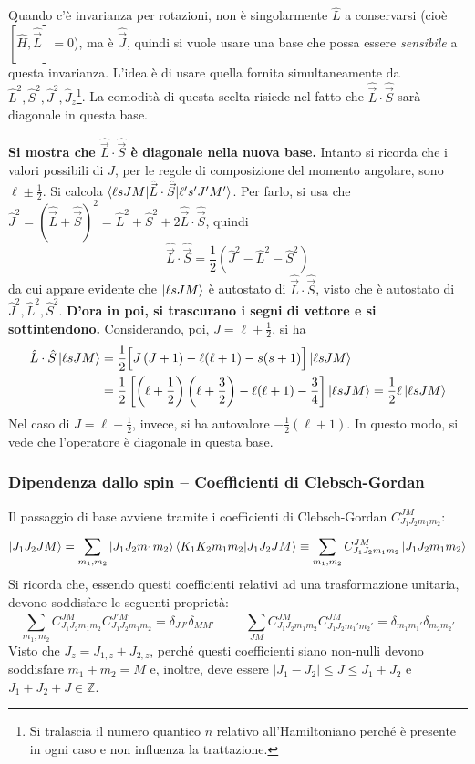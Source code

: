 \documentclass[11pt, a4paper]{scrartcl} %
\numberwithin{equation}{subsection}
\theoremstyle{style2}
\theoremstyle{style1}
\begin{document}
Quando c'\`e invarianza per rotazioni, non \`e singolarmente $\hat{L}$ a conservarsi (cio\`e $[\hat{H}, \hat{\vec{L}}] = 0$), ma \`e $\hat{\vec{J}}$, quindi si vuole usare una base che possa essere \textit{sensibile} a questa invarianza.
L'idea \`e di usare  quella fornita simultaneamente da $\hat{L}^2, \hat{S}^2, \hat{J}^2 , \hat{J}_z$\footnote{Si tralascia il numero quantico $n$ relativo all'Hamiltoniano perch\'e \`e presente in ogni caso e non influenza la trattazione.}.
La comodit\`a di questa scelta risiede nel fatto che $\hat{\vec{L}}\cdot \hat{\vec{S}}$ sar\`a diagonale in questa base.

\vspace{.5cm}	
{\bfseries\sffamily Si mostra che $\hat{\vec{L}}\cdot \hat{\vec{S}}$ \`e diagonale nella nuova base.} Intanto si ricorda che i valori possibili di $J$, per le regole di composizione del momento angolare, sono $\ell  \pm \frac{1}{2}$.
Si calcola $\braket{\ell sJM|\hat{\vec{L}}\cdot \hat{\vec{S}}|\ell 's' J'M'} $.
Per farlo, si usa che $\hat{J}^2 = (\hat{\vec{L}}+ \hat{\vec{S}})^2 = \hat{L}^2 + \hat{S}^2 + 2 \hat{\vec{L}}\cdot \hat{\vec{S}}$, quindi
\[
\hat{\vec{L}}\cdot \hat{\vec{S}} = \frac{1}{2}\left(\hat{J}^2 - \hat{L}^2 - \hat{S}^2\right) 
\] 
da cui appare evidente che $\ket{\ell s JM} $ \`e autostato di $\hat{\vec{L}}\cdot \hat{\vec{S}}$, visto che \`e autostato di $\hat{J}^2 ,\hat{L}^2, \hat{S}^2$.
\textbf{D'ora in poi, si trascurano i segni di vettore e si sottintendono.} 
Considerando, poi, $J = \ell  + \frac{1}{2}$, si ha
\[
	\begin{split}
		\hat{L}\cdot \hat{S} \ket{\ell s JM } &= \frac{1}{2}\Big[ J\left(J + 1\right) - \ell (\ell +1) - s (s+1) \Big] \ket{\ell s JM} \\
						      &= \frac{1}{2}\left[ \left(\ell +\frac{1}{2}\right)\left(\ell +\frac{3}{2}\right) - \ell (\ell +1) - \frac{3}{4} \right] \ket{\ell s JM} = \frac{1}{2}\ell \ket{\ell s JM} 
	\end{split}
\] 
Nel caso di $J = \ell  -\frac{1}{2}$, invece, si ha autovalore $-\frac{1}{2}(\ell +1)$. 
In questo modo, si vede che l'operatore \`e diagonale in questa base.
\subsubsection{Dipendenza dallo spin -- Coefficienti di Clebsch-Gordan}
Il passaggio di base avviene tramite i coefficienti di Clebsch-Gordan $C^{JM} _{J_1J_2m_1m_2} $:
\[
\ket{J_1J_2JM} = \sum_{m_1, m_2}^{} \ket{J_1J_2m_1m_2} \braket{K_1K_2m_1m_2|J_1J_2JM} \equiv \sum_{m_1, m_2}^{}C^{JM} _{J_1J_2m_1m_2} \ket{J_1J_2m_1m_2}
\] 
Si ricorda che, essendo questi coefficienti relativi ad una trasformazione unitaria, devono soddisfare le seguenti propriet\`a:
\[
\sum_{m_1,m_2}^{} C^{JM} _{J_1J_2m_1m_2} C^{J'M'} _{J_1J_2m_1m_2} = \delta _{JJ'} \delta _{MM'} \hspace{1cm}\sum_{JM}^{} C^{JM} _{J_1J_2m_1m_2} C^{JM} _{J_1J_2m_1'm_2'} = \delta _{m_1m_1'} \delta _{m_2m_2'} 
\] 
Visto che $J_z = J_{1,z} + J_{2,z} $, perch\'e questi coefficienti siano non-nulli devono soddisfare $m_1+m_2 = M$ e, inoltre, deve essere $\lvert J_1-J_2 \rvert \le J \le  J_1+J_2$ e $J_1+J_2+J \in \mathbb{Z}$.
\end{document}
